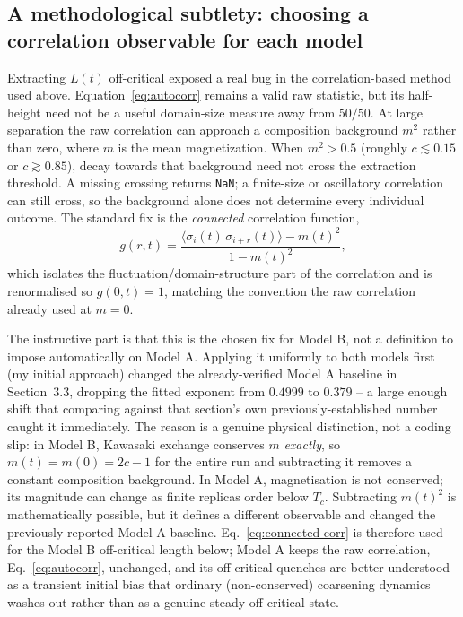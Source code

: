 \documentclass[11pt]{article}
\begin{document}
\subsection{A methodological subtlety: choosing a correlation observable for each model}

Extracting $L(t)$ off-critical exposed a real bug in the correlation-based
method used above. Equation~\eqref{eq:autocorr} remains a valid raw statistic,
but its half-height need not be a useful domain-size measure away from
$50/50$. At large separation the raw correlation can approach a composition
background $m^2$ rather than zero, where $m$ is the mean magnetization.
When $m^2 > 0.5$ (roughly $c \lesssim 0.15$ or $c \gtrsim 0.85$), decay
towards that background need not cross the extraction threshold.
A missing crossing returns \texttt{NaN}; a finite-size or oscillatory
correlation can still cross, so the background alone does not determine
every individual outcome.
The standard fix is the \emph{connected} correlation function,
\begin{equation}
g(r,t) = \frac{\langle \sigma_i(t)\,\sigma_{i+r}(t)\rangle - m(t)^2}{1 - m(t)^2},
\label{eq:connected-corr}
\end{equation}
which isolates the fluctuation/domain-structure part of the correlation
and is renormalised so $g(0,t)=1$, matching the convention the raw
correlation already used at $m=0$.

The instructive part is that this is the chosen fix for Model B, not a
definition to impose automatically on Model A. Applying it uniformly to
both models first (my initial approach) changed
the already-verified Model A baseline in Section~3.3, dropping the fitted
exponent from $0.4999$ to $0.379$ -- a large enough shift that comparing
against that section's own previously-established number caught it
immediately. The reason is a genuine physical distinction, not a coding
slip: in Model B, Kawasaki exchange conserves $m$ \emph{exactly}, so
$m(t)=m(0)=2c-1$ for the entire run and subtracting it removes a
constant composition background. In Model A, magnetisation is not conserved;
its magnitude can change as finite replicas order below $T_c$. Subtracting
$m(t)^2$ is mathematically possible, but it defines a different observable
and changed the previously reported Model A baseline. Eq.~\eqref{eq:connected-corr}
is therefore used for the Model B off-critical length below; Model A keeps
the raw correlation, Eq.~\eqref{eq:autocorr},
unchanged, and its off-critical quenches are better understood as a
transient initial bias that ordinary (non-conserved) coarsening dynamics
washes out rather than as a genuine steady off-critical state.
\end{document}
